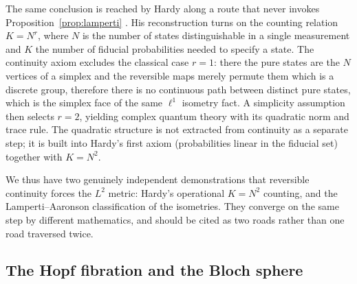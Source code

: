 \documentclass{article}
\begin{document}
The same conclusion is reached by Hardy along a route that never invokes
Proposition~\ref{prop:lamperti} \autocite{Hardy2001a}. His reconstruction turns on
the counting relation $K=N^{r}$, where $N$ is the number of states
distinguishable in a single measurement and $K$ the number of fiducial
probabilities needed to specify a state. The continuity axiom excludes the
classical case $r=1$: there the pure states are the $N$ vertices of a simplex and
the reversible maps merely permute them which is a discrete group, therefore there is no continuous path
between distinct pure states, which is the simplex face of the same $\ell^{1}$
isometry fact. A simplicity assumption then selects $r=2$, yielding complex
quantum theory with its quadratic norm and trace rule. The quadratic structure is
not extracted from continuity as a separate step; it is built into Hardy's first
axiom (probabilities linear in the fiducial set) together with $K=N^{2}$.

We thus have two genuinely independent demonstrations that reversible continuity
forces the $L^{2}$ metric: Hardy's operational $K=N^{2}$ counting, and the
Lamperti--Aaronson classification of the isometries. They converge on the same
step by different mathematics, and should be cited as two roads rather than one
road traversed twice.

\subsection{The Hopf fibration and the Bloch sphere}
\label{sec:hopf-bloch}
\end{document}
